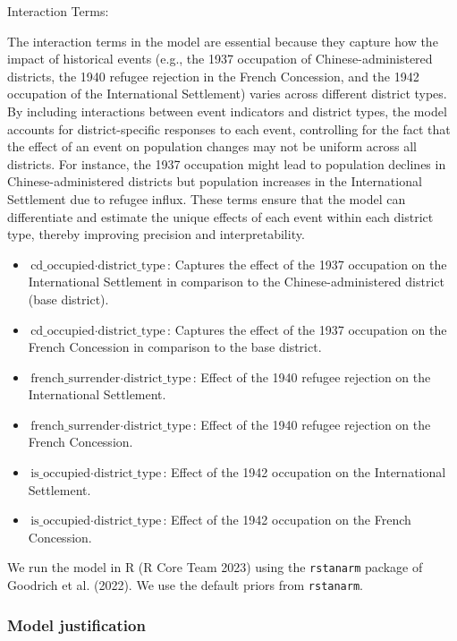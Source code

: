 \documentclass[
  letterpaper,
  DIV=11,
  numbers=noendperiod]{scrartcl}
\providecommand{\tightlist}{%
  \setlength{\itemsep}{0pt}\setlength{\parskip}{0pt}}\usepackage{longtable,booktabs,array}
\begin{document}
Interaction Terms:

The interaction terms in the model are essential because they capture
how the impact of historical events (e.g., the 1937 occupation of
Chinese-administered districts, the 1940 refugee rejection in the French
Concession, and the 1942 occupation of the International Settlement)
varies across different district types. By including interactions
between event indicators and district types, the model accounts for
district-specific responses to each event, controlling for the fact that
the effect of an event on population changes may not be uniform across
all districts. For instance, the 1937 occupation might lead to
population declines in Chinese-administered districts but population
increases in the International Settlement due to refugee influx. These
terms ensure that the model can differentiate and estimate the unique
effects of each event within each district type, thereby improving
precision and interpretability.

\begin{itemize}
\tightlist
\item
  \(\text{cd_occupied} \cdot \text{district_type}\): Captures the effect
  of the 1937 occupation on the International Settlement in comparison
  to the Chinese-administered district (base district).
\item
  \(\text{cd_occupied} \cdot \text{district_type}\): Captures the effect
  of the 1937 occupation on the French Concession in comparison to the
  base district.
\item
  \(\text{french_surrender} \cdot \text{district_type}\): Effect of the
  1940 refugee rejection on the International Settlement.
\item
  \(\text{french_surrender} \cdot \text{district_type}\): Effect of the
  1940 refugee rejection on the French Concession.
\item
  \(\text{is_occupied} \cdot \text{district_type}\): Effect of the 1942
  occupation on the International Settlement.
\item
  \(\text{is_occupied} \cdot \text{district_type}\): Effect of the 1942
  occupation on the French Concession.
\end{itemize}

We run the model in R (R Core Team 2023) using the \texttt{rstanarm}
package of Goodrich et al. (2022). We use the default priors from
\texttt{rstanarm}.

\hypertarget{model-justification}{%
\subsubsection{Model justification}\label{model-justification}}
\end{document}
